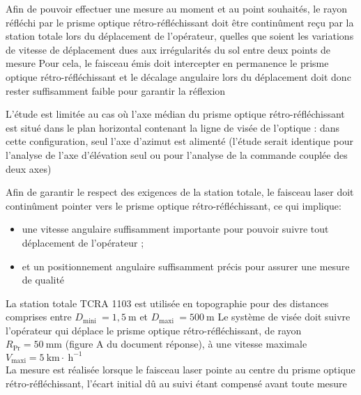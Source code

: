 Afin de pouvoir effectuer une mesure au moment et au point souhaités, le rayon réfléchi par le prisme optique rétro-réfléchissant doit être continûment reçu par la station totale lors du déplacement de l'opérateur, quelles que soient les variations de vitesse de déplacement dues aux irrégularités du sol entre deux points de mesure Pour cela, le faisceau émis doit intercepter en permanence le prisme optique rétro-réfléchissant et le décalage angulaire lors du déplacement doit donc rester suffisamment faible pour garantir la réflexion

L'étude est limitée au cas où l'axe médian du prisme optique rétro-réfléchissant est situé dans le plan horizontal contenant la ligne de visée de l'optique : dans cette configuration, seul l'axe d'azimut est alimenté (l'étude serait identique pour l'analyse de l'axe d'élévation seul ou pour l'analyse de la commande couplée des deux axes)

Afin de garantir le respect des exigences de la station totale, le faisceau laser doit continûment pointer vers le prisme optique rétro-réfléchissant, ce qui implique:

\begin{itemize}
  \item une vitesse angulaire suffisamment importante pour pouvoir suivre tout déplacement de l'opérateur ;
  \item et un positionnement angulaire suffisamment précis pour assurer une mesure de qualité
\end{itemize}

La station totale TCRA 1103 est utilisée en topographie pour des distances comprises entre $D_{\text {mini }}=1,5 \mathrm{~m}$ et $D_{\text {maxi }}=500 \mathrm{~m}$ Le système de visée doit suivre l'opérateur qui déplace le prisme optique rétro-réfléchissant, de rayon $R_{\mathrm{Pr}}=50 \mathrm{~mm}$ (figure A du document réponse), à une vitesse maximale $V_{\mathrm{maxi}}=5 \mathrm{~km} \cdot \mathrm{~h}^{-1}$\\
La mesure est réalisée lorsque le faisceau laser pointe au centre du prisme optique rétro-réfléchissant, l'écart initial dû au suivi étant compensé avant toute mesure\\
\fi




